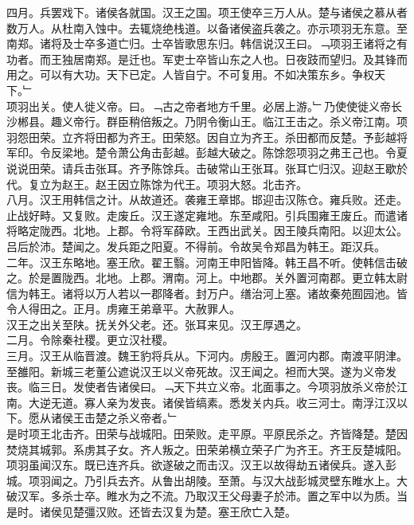 \documentclass{zhvt-classic}
\begin{document}
\hspace*{2em}四月。兵罢戏下。诸侯各就国。汉王之国。项王使卒三万人从。楚与诸侯之慕从者数万人。从杜南入蚀中。去辄烧绝栈道。以备诸侯盗兵袭之。亦示项羽无东意。至南郑。诸将及士卒多道亡归。士卒皆歌思东归。韩信说汉王曰。﹁项羽王诸将之有功者。而王独居南郑。是迁也。军吏士卒皆山东之人也。日夜跂而望归。及其锋而用之。可以有大功。天下已定。人皆自宁。不可复用。不如决策东乡。争权天下。﹂\\
\hspace*{2em}项羽出关。使人徙义帝。曰。﹁古之帝者地方千里。必居上游。﹂乃使使徙义帝长沙郴县。趣义帝行。群臣稍倍叛之。乃阴令衡山王。临江王击之。杀义帝江南。项羽怨田荣。立齐将田都为齐王。田荣怒。因自立为齐王。杀田都而反楚。予彭越将军印。令反梁地。楚令萧公角击彭越。彭越大破之。陈馀怨项羽之弗王己也。令夏说说田荣。请兵击张耳。齐予陈馀兵。击破常山王张耳。张耳亡归汉。迎赵王歇於代。复立为赵王。赵王因立陈馀为代王。项羽大怒。北击齐。\\
\hspace*{2em}八月。汉王用韩信之计。从故道还。袭雍王章邯。邯迎击汉陈仓。雍兵败。还走。止战好畤。又复败。走废丘。汉王遂定雍地。东至咸阳。引兵围雍王废丘。而遣诸将略定陇西。北地。上郡。令将军薛欧。王西出武关。因王陵兵南阳。以迎太公。吕后於沛。楚闻之。发兵距之阳夏。不得前。令故吴令郑昌为韩王。距汉兵。\\
\hspace*{2em}二年。汉王东略地。塞王欣。翟王翳。河南王申阳皆降。韩王昌不听。使韩信击破之。於是置陇西。北地。上郡。渭南。河上。中地郡。关外置河南郡。更立韩太尉信为韩王。诸将以万人若以一郡降者。封万户。缮治河上塞。诸故秦苑囿园池。皆令人得田之。正月。虏雍王弟章平。大赦罪人。\\
\hspace*{2em}汉王之出关至陕。抚关外父老。还。张耳来见。汉王厚遇之。\\
\hspace*{2em}二月。令除秦社稷。更立汉社稷。\\
\hspace*{2em}三月。汉王从临晋渡。魏王豹将兵从。下河内。虏殷王。置河内郡。南渡平阴津。至雒阳。新城三老董公遮说汉王以义帝死故。汉王闻之。袒而大哭。遂为义帝发丧。临三日。发使者告诸侯曰。﹁天下共立义帝。北面事之。今项羽放杀义帝於江南。大逆无道。寡人亲为发丧。诸侯皆缟素。悉发关内兵。收三河士。南浮江汉以下。愿从诸侯王击楚之杀义帝者。﹂\\
\hspace*{2em}是时项王北击齐。田荣与战城阳。田荣败。走平原。平原民杀之。齐皆降楚。楚因焚烧其城郭。系虏其子女。齐人叛之。田荣弟横立荣子广为齐王。齐王反楚城阳。项羽虽闻汉东。既已连齐兵。欲遂破之而击汉。汉王以故得劫五诸侯兵。遂入彭城。项羽闻之。乃引兵去齐。从鲁出胡陵。至萧。与汉大战彭城灵壁东睢水上。大破汉军。多杀士卒。睢水为之不流。乃取汉王父母妻子於沛。置之军中以为质。当是时。诸侯见楚彊汉败。还皆去汉复为楚。塞王欣亡入楚。\\
\end{document}
